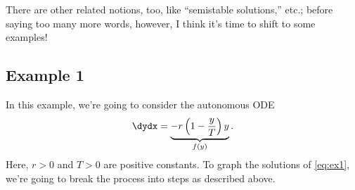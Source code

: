 \documentclass[12pt]{article}
\theoremstyle{definition}
\theoremstyle{underl}
\begin{document}
	There are other related notions, too, like ``semistable solutions,'' etc.; before saying too many more words, however, I think it's time to shift to some examples!
	

	\subsection*{Example 1}
	In this example, we're going to consider the autonomous ODE
	\begin{equation}
		\label{eq:ex1}
		\dydx = \underbrace{-r\left(1-\frac{y}{T}\right) y}_{f(y)}.
	\end{equation}
	Here, $r>0$ and $T>0$ are positive constants. To graph the solutions of \eqref{eq:ex1}, we're going to break the process into steps as described above.
\end{document}
